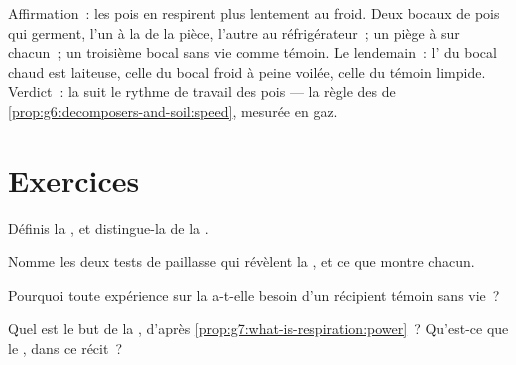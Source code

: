 \begin{example}\label{ex:g7:what-is-respiration:coldseed}
Affirmation~: les pois en  respirent plus lentement au
froid. Deux bocaux de pois qui germent, l'un à la  de la
pièce, l'autre au réfrigérateur~; un piège à  sur
chacun~; un troisième bocal sans vie comme témoin. Le lendemain~:
l' du bocal chaud est laiteuse, celle du bocal froid à
peine voilée, celle du témoin limpide. Verdict~: la  suit
le rythme de travail des pois --- la règle des  de
\cref{prop:g6:decomposers-and-soil:speed}, mesurée en gaz.
\end{example}

\section{Exercices}

\begin{exercise}[$\star$]\label{exo:g7:what-is-respiration:1}
Définis la , et distingue-la de la .
\end{exercise}

\begin{exercise}[$\star$]\label{exo:g7:what-is-respiration:2}
Nomme les deux tests de paillasse qui révèlent la , et ce
que montre chacun.
\end{exercise}

\begin{exercise}[$\star$]\label{exo:g7:what-is-respiration:3}
Pourquoi toute expérience sur la  a-t-elle besoin d'un
récipient témoin sans vie~?
\end{exercise}

\begin{exercise}[$\star$]\label{exo:g7:what-is-respiration:4}
Quel est le but de la , d'après
\cref{prop:g7:what-is-respiration:power}~? Qu'est-ce que le , dans ce récit~?
\end{exercise}


